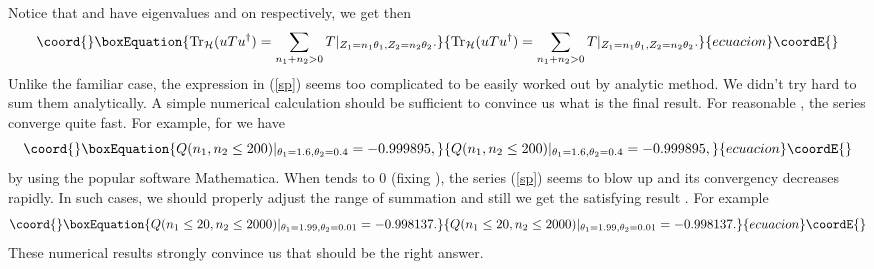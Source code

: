 \documentclass[a4paper,a4paper]{article}
\begin{document}
Notice that \coordHE{} and \coordHE{} have eigenvalues \coordHE{} and \coordHE{} on \coordHE{} respectively, we get
then
\begin{equation}\coord{}\boxEquation{
\label{sp}
{\rm Tr}_{\cal H}(uTu^\dag)=\sum_{n_1+n_2>0}T|_{Z_1=n_1\theta_1,
Z_2=n_2\theta_2}.
}{
{\rm Tr}_{\cal H}(uTu^\dag)=\sum_{n_1+n_2>0}T|_{Z_1=n_1\theta_1,
Z_2=n_2\theta_2}.
}{ecuacion}\coordE{}\end{equation}
Unlike the familiar \coordHE{} case, the expression in
(\ref{sp}) seems too complicated to be easily worked out by
analytic method. We didn't try hard to sum them analytically. A
simple numerical calculation should be sufficient to convince us
what is the final result.  For reasonable \coordHE{}, the
series converge quite fast. For example, for
\coordHE{} we have
\begin{equation}\coord{}\boxEquation{
Q(n_1,n_2\leq 200)|_{\theta_1=1.6,\theta_2=0.4}=-0.999895,
}{
Q(n_1,n_2\leq 200)|_{\theta_1=1.6,\theta_2=0.4}=-0.999895,
}{ecuacion}\coordE{}\end{equation}
by using the popular software Mathematica. When \coordHE{} tends
to 0 (fixing \coordHE{}), the series (\ref{sp}) seems to blow up
and its convergency decreases rapidly. In such cases, we should
properly adjust the range of summation and still we get the
satisfying result \coordHE{}. For example
\begin{equation}\coord{}\boxEquation{
Q(n_1\leq 20,n_2\leq 2000)|_{\theta_1=1.99,\theta_2=0.01}=-0.998137.
}{
Q(n_1\leq 20,n_2\leq 2000)|_{\theta_1=1.99,\theta_2=0.01}=-0.998137.
}{ecuacion}\coordE{}\end{equation}
These numerical results strongly convince us that \coordHE{} should be the
right answer.
\end{document}
